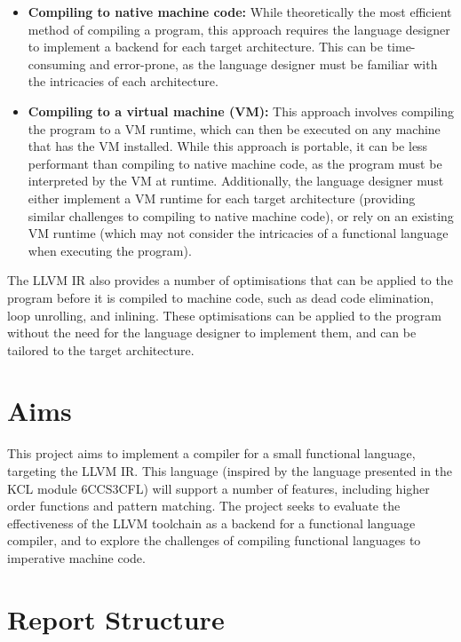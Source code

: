 \begin{itemize}
    \item \textbf{Compiling to native machine code:} While theoretically the most efficient method
          of compiling a program, this approach requires the language designer to implement a
          backend for each target architecture. This can be time-consuming and error-prone, as the
          language designer must be familiar with the intricacies of each architecture.

    \item \textbf{Compiling to a virtual machine (VM):} This approach involves compiling the program
          to a VM runtime, which can then be executed on any machine that has the VM installed.
          While this approach is portable, it can be less performant than compiling to native
          machine code, as the program must be interpreted by the VM at runtime. Additionally, the
          language designer must either implement a VM runtime for each target architecture
          (providing similar challenges to compiling to native machine code), or rely on an existing
          VM runtime (which may not consider the intricacies of a functional language when executing
          the program).
\end{itemize}

The LLVM IR also provides a number of optimisations that can be applied to the program before it is
compiled to machine code, such as dead code elimination, loop unrolling, and inlining. These
optimisations can be applied to the program without the need for the language designer to implement
them, and can be tailored to the target architecture.

\section{Aims}

This project aims to implement a compiler for a small functional language, targeting the LLVM IR.
This language (inspired by the language presented in the KCL module 6CCS3CFL) will support a number
of features, including higher order functions and pattern matching. The project seeks to evaluate
the effectiveness of the LLVM toolchain as a backend for a functional language compiler, and to
explore the challenges of compiling functional languages to imperative machine code.

\section{Report Structure}

